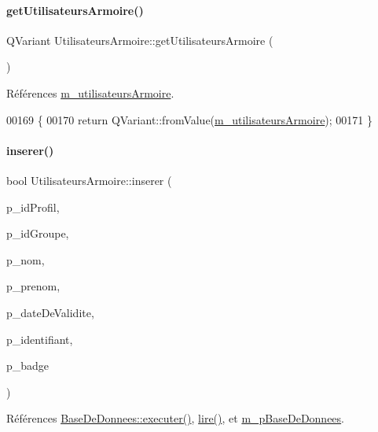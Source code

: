 \paragraph{\texorpdfstring{get\+Utilisateurs\+Armoire()}{getUtilisateursArmoire()}}
{\footnotesize\ttfamily Q\+Variant Utilisateurs\+Armoire\+::get\+Utilisateurs\+Armoire (\begin{DoxyParamCaption}{ }\end{DoxyParamCaption})}



Références \hyperlink{class_utilisateurs_armoire_aade1e94417c9729b9e8cadaf19e3227d}{m\+\_\+utilisateurs\+Armoire}.


\begin{DoxyCode}
00169 \{
00170     \textcolor{keywordflow}{return} QVariant::fromValue(\hyperlink{class_utilisateurs_armoire_aade1e94417c9729b9e8cadaf19e3227d}{m\_utilisateursArmoire});
00171 \}
\end{DoxyCode}
\mbox{\label{class_utilisateurs_armoire_a773bfde7c49dac8fa2c8a1c9a43592c0}} 
\paragraph{\texorpdfstring{inserer()}{inserer()}}
{\footnotesize\ttfamily bool Utilisateurs\+Armoire\+::inserer (\begin{DoxyParamCaption}\item[{Q\+String}]{p\+\_\+id\+Profil,  }\item[{Q\+String}]{p\+\_\+id\+Groupe,  }\item[{Q\+String}]{p\+\_\+nom,  }\item[{Q\+String}]{p\+\_\+prenom,  }\item[{Q\+String}]{p\+\_\+date\+De\+Validite,  }\item[{Q\+String}]{p\+\_\+identifiant,  }\item[{Q\+String}]{p\+\_\+badge }\end{DoxyParamCaption})}



Références \hyperlink{class_base_de_donnees_aa8de5f8f8bb17edc43f5c0ee33712081}{Base\+De\+Donnees\+::executer()}, \hyperlink{class_utilisateurs_armoire_a10b2038874606c0afccf0f18c038dd0c}{lire()}, et \hyperlink{class_utilisateurs_armoire_ac43b4894f5036117d044ad2d22b09318}{m\+\_\+p\+Base\+De\+Donnees}.


